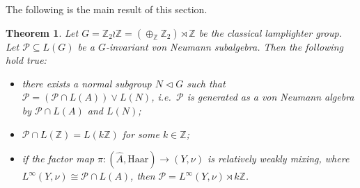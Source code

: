 \documentclass[11pt]{amsart}
\newcommand{\Z}{\mathbb Z}
\theoremstyle{plain}
\newtheorem{theorem}{Theorem}[section]
\theoremstyle{definition}
\theoremstyle{remark}
\numberwithin{equation}{section}
\begin{document}
The following is the main result of this section.
\begin{theorem}
\label{thm:lamplighter}
Let $G=\mathbb{Z}_2\wr\mathbb{Z}=(\oplus_{\mathbb{Z}}\Z_2)\rtimes \mathbb{Z}$ be the classical lamplighter group. 
Let $\mathcal{P}\subseteq L(G)$ be a $G$-invariant von Neumann subalgebra. Then the following hold true:
\begin{itemize}
\item[(i)] there exists a normal subgroup $N\lhd G$ such that $\mathcal{P}=(\mathcal{P}\cap L(A))\vee L(N)$, i.e.\ $\mathcal{P}$ is generated as a von Neumann algebra by $\mathcal{P}\cap L(A)$ and $L(N)$; 
\item[(ii)] $\mathcal{P}\cap L(\mathbb{Z})=L(k\mathbb{Z})$ for some $k\in\mathbb{Z}$;
\item[(iii)] if the factor map $\pi: (\widehat{A},\text{Haar})\rightarrow (Y,\nu)$ is relatively weakly mixing, where $L^{\infty}(Y,\nu)\cong \mathcal{P}\cap L(A)$, then $\mathcal{P}=L^{\infty}(Y,\nu)\rtimes k\mathbb{Z}$.
\end{itemize}
\end{theorem}
\end{document}
